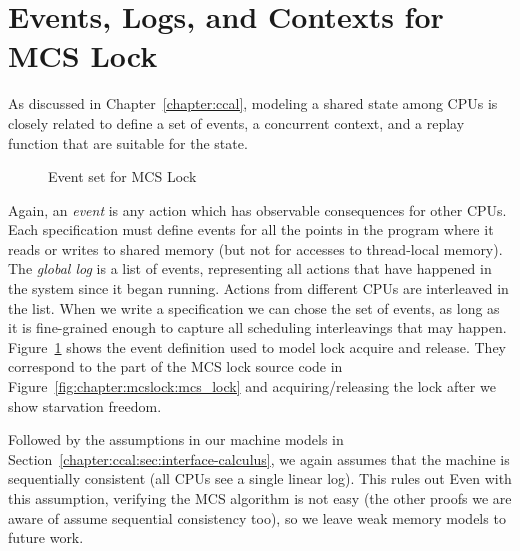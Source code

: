 \section{Events, Logs, and  Contexts for MCS Lock}
\label{chapter:mcslock:sec:eventlogandoracle}

As discussed in Chapter~\ref{chapter:ccal}, 
modeling a shared state among CPUs is 
closely related to define a set of events, a concurrent context, and a replay function that are suitable for
the state.


\begin{figure}
\begin{minipage}{\linewidth}

\end{minipage}
\caption{Event set for MCS Lock}
\label{fig:chapter:mcslock:lock_event_type}
\end{figure}

Again, an \emph{event} is any action which has observable consequences for
other CPUs. Each specification must define events for all the points
in the program where it reads or writes to shared memory (but not for
accesses to thread-local memory). The \emph{global log} is a list of
events, representing all actions that have happened in the system
since it began running. Actions from different CPUs are interleaved in
the list.
When we write a specification we can chose the set of events, as long
as it is fine-grained enough to capture all scheduling interleavings
that may happen.
Figure~\ref{fig:chapter:mcslock:lock_event_type} shows the event definition used to
model lock acquire and release. They correspond to the part of the MCS lock source code in Figure~\ref{fig:chapter:mcslock:mcs_lock}
and acquiring/releasing the lock after we show starvation freedom. 


Followed by the assumptions in our machine models in Section~\ref{chapter:ccal:sec:interface-calculus},  we again assumes that the
machine is sequentially consistent (all CPUs see a single linear log). 
This rules out 
Even with this assumption,
verifying the MCS algorithm is not easy (the other proofs we are aware
of assume sequential consistency too), so we leave weak memory models
to future work.

